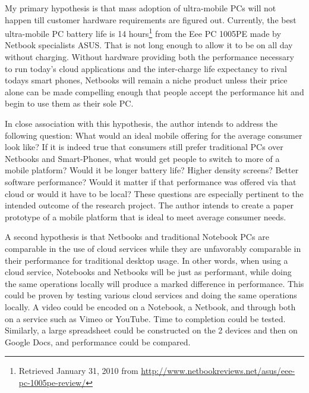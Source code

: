 My primary hypothesis is that mass adoption of ultra-mobile PCs will not happen
till customer hardware requirements are figured out.  Currently, the best
ultra-mobile PC battery life is 14 hours\footnote{Retrieved January 31, 2010
from \url{http://www.netbookreviews.net/asus/eee-pc-1005pe-review/}} from the
Eee PC 1005PE made by Netbook specialists ASUS.  That is not long enough to
allow it to be on all day without charging.  Without hardware providing both the
performance necessary to run today's cloud applications and the inter-charge
life expectancy to rival todays smart phones, Netbooks will remain a niche
product unless their price alone can be made compelling enough that people
accept the performance hit and begin to use them as their sole PC.

In close association with this hypothesis, the author intends to address the
following question: What would an ideal mobile offering for the average consumer
look like?  If it is indeed true that consumers still prefer traditional PCs
over Netbooks and Smart-Phones, what would get people to switch to more of a
mobile platform?  Would it be longer battery life?  Higher density screens?
Better software performance?  Would it matter if that performance was offered
via that cloud or would it have to be local?  These questions are especially
pertinent to the intended outcome of the research project.  The author intends
to create a paper prototype of a mobile platform that is ideal to meet average
consumer needs.

A second hypothesis is that Netbooks and traditional Notebook PCs are comparable
in the use of cloud services while they are unfavorably comparable in their
performance for traditional desktop usage.  In other words, when using a cloud
service, Notebooks and Netbooks will be just as performant, while doing the same
operations locally will produce a marked difference in performance.  This could
be proven by testing various cloud services and doing the same operations
locally.  A video could be encoded on a Notebook, a Netbook, and through both on
a service such as Vimeo or YouTube.  Time to completion could be
tested. Similarly, a large spreadsheet could be constructed on the 2 devices and
then on Google Docs, and performance could be compared.
